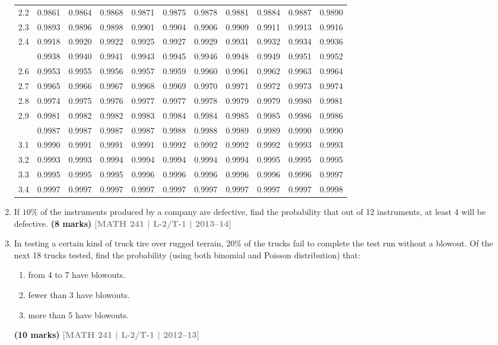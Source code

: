 \documentclass[12pt,a4paper]{article}
\newcommand{\yr}[1]{\hfill\textcolor{gray}{\small\textbf{[#1]}}}
\newcommand{\mk}[1]{\textcolor{orange!70!black}{\small\textbf{(#1 marks)}}}
\begin{document}
\begin{enumerate}
\begin{center}
\begin{longtable}{ccccccccccc}
2.2 & 0.9861 & 0.9864 & 0.9868 & 0.9871 & 0.9875 & 0.9878 & 0.9881 & 0.9884 & 0.9887 & 0.9890 \\
2.3 & 0.9893 & 0.9896 & 0.9898 & 0.9901 & 0.9904 & 0.9906 & 0.9909 & 0.9911 & 0.9913 & 0.9916 \\
2.4 & 0.9918 & 0.9920 & 0.9922 & 0.9925 & 0.9927 & 0.9929 & 0.9931 & 0.9932 & 0.9934 & 0.9936 \\
\addlinespace
2.5 & 0.9938 & 0.9940 & 0.9941 & 0.9943 & 0.9945 & 0.9946 & 0.9948 & 0.9949 & 0.9951 & 0.9952 \\
2.6 & 0.9953 & 0.9955 & 0.9956 & 0.9957 & 0.9959 & 0.9960 & 0.9961 & 0.9962 & 0.9963 & 0.9964 \\
2.7 & 0.9965 & 0.9966 & 0.9967 & 0.9968 & 0.9969 & 0.9970 & 0.9971 & 0.9972 & 0.9973 & 0.9974 \\
2.8 & 0.9974 & 0.9975 & 0.9976 & 0.9977 & 0.9977 & 0.9978 & 0.9979 & 0.9979 & 0.9980 & 0.9981 \\
2.9 & 0.9981 & 0.9982 & 0.9982 & 0.9983 & 0.9984 & 0.9984 & 0.9985 & 0.9985 & 0.9986 & 0.9986 \\
\addlinespace
3.0 & 0.9987 & 0.9987 & 0.9987 & 0.9987 & 0.9988 & 0.9988 & 0.9989 & 0.9989 & 0.9990 & 0.9990 \\
3.1 & 0.9990 & 0.9991 & 0.9991 & 0.9991 & 0.9992 & 0.9992 & 0.9992 & 0.9992 & 0.9993 & 0.9993 \\
3.2 & 0.9993 & 0.9993 & 0.9994 & 0.9994 & 0.9994 & 0.9994 & 0.9994 & 0.9995 & 0.9995 & 0.9995 \\
3.3 & 0.9995 & 0.9995 & 0.9995 & 0.9996 & 0.9996 & 0.9996 & 0.9996 & 0.9996 & 0.9996 & 0.9997 \\
3.4 & 0.9997 & 0.9997 & 0.9997 & 0.9997 & 0.9997 & 0.9997 & 0.9997 & 0.9997 & 0.9997 & 0.9998 \\
\end{longtable}
\end{center}

\item If $10\%$ of the instruments produced by a company are defective, find the probability that out of 12 instruments, at least 4 will be defective.
\mk{8} \yr{MATH 241 | L-2/T-1 | 2013--14}

\item In testing a certain kind of truck tire over rugged terrain, $20\%$ of the trucks fail to complete the test run without a blowout. Of the next 18 trucks tested, find the probability (using both binomial and Poisson distribution) that:
\begin{enumerate}
  \item from 4 to 7 have blowouts.
  \item fewer than 3 have blowouts.
  \item more than 5 have blowouts.
\end{enumerate}
\mk{10} \yr{MATH 241 | L-2/T-1 | 2012--13}


\end{enumerate}
\end{document}
